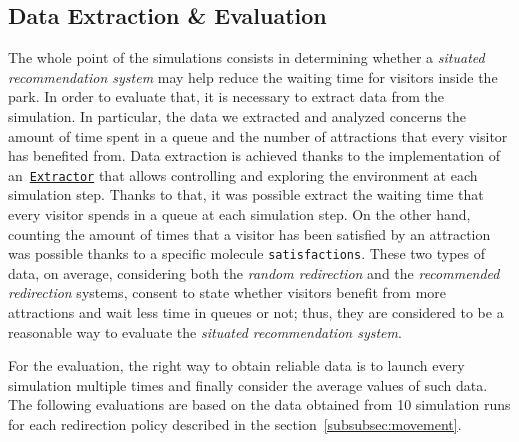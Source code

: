 \subsection{Data Extraction \& Evaluation}\label{subsec:data-extraction}
The whole point of the simulations consists in determining whether a \textit{situated recommendation system} may help reduce the waiting time for visitors inside the park.
In order to evaluate that, it is necessary to extract data from the simulation.
In particular, the data we extracted and analyzed concerns the amount of time spent in a queue and the number of attractions that every visitor has benefited from.
Data extraction is achieved thanks to the implementation of an~\href{https://alchemistsimulator.github.io/reference/kdoc/alchemist/it.unibo.alchemist.loader.export/-extractor/index.html}{\texttt{Extractor}} that allows controlling and exploring the environment at each simulation step.
Thanks to that, it was possible extract the waiting time that every visitor spends in a queue at each simulation step.
On the other hand, counting the amount of times that a visitor has been satisfied by an attraction was possible thanks to a specific molecule \texttt{satisfactions}.
These two types of data, on average, considering both the \textit{random redirection} and the \textit{recommended redirection} systems, consent to state whether visitors benefit from more attractions and wait less time in queues or not;
thus, they are considered to be a reasonable way to evaluate the \textit{situated recommendation system}.

For the evaluation, the right way to obtain reliable data is to launch every simulation multiple times and finally consider the average values of such data.
The following evaluations are based on the data obtained from 10 simulation runs for each redirection policy described in the section~\ref{subsubsec:movement}.

